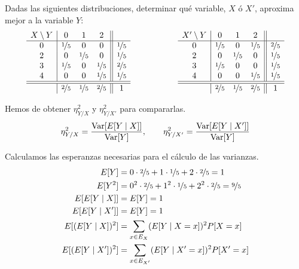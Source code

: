 \begin{ejercicio}
    Dadas las siguientes distribuciones, determinar qué variable, $X$ ó $X'$, aproxima mejor a la variable $Y$:
    \begin{equation*}
        \begin{array}{c|ccc||c}
            X\setminus Y & 0 & 1 & 2\\
            \hline
            0 & \nicefrac{1}{5} & 0 & 0 & \nicefrac{1}{5}\\
            2 & 0 & \nicefrac{1}{5} & 0 & \nicefrac{1}{5}\\
            3 & \nicefrac{1}{5} & 0 & \nicefrac{1}{5} & \nicefrac{2}{5}\\
            4 & 0 & 0 & \nicefrac{1}{5} & \nicefrac{1}{5}\\
            \hline \hline
            & \nicefrac{2}{5} & \nicefrac{1}{5} & \nicefrac{2}{5} & 1
        \end{array}
        \hspace{2cm}
        \begin{array}{c|ccc||c}
            X'\setminus Y & 0 & 1 & 2\\
            \hline
            0 & \nicefrac{1}{5} & 0 & \nicefrac{1}{5} & \nicefrac{2}{5}\\
            2 & 0 & \nicefrac{1}{5} & 0 & \nicefrac{1}{5}\\
            3 & \nicefrac{1}{5} & 0 & 0 & \nicefrac{1}{5}\\
            4 & 0 & 0 & \nicefrac{1}{5} & \nicefrac{1}{5}\\
            \hline \hline
            & \nicefrac{2}{5} & \nicefrac{1}{5} & \nicefrac{2}{5} & 1
        \end{array}
    \end{equation*}

    Hemos de obtener $\eta^2_{Y/X}$ y $\eta^2_{Y/X'}$ para compararlas.
    \begin{equation*}
        \eta^2_{Y/X} = \dfrac{\operatorname{Var}[E[Y\mid X]]}{\operatorname{Var}[Y]}, \qquad \eta^2_{Y/X'} = \dfrac{\operatorname{Var}[E[Y\mid X']]}{\operatorname{Var}[Y]}
    \end{equation*}

    Calculamos las esperanzas necesarias para el cálculo de las varianzas.
    \begin{align*}
        E[Y] &= 0\cdot \nicefrac{2}{5} + 1\cdot \nicefrac{1}{5} + 2\cdot \nicefrac{2}{5} = 1\\
        E[Y^2] &= 0^2\cdot \nicefrac{2}{5} + 1^2\cdot \nicefrac{1}{5} + 2^2\cdot \nicefrac{2}{5} = \nicefrac{9}{5}\\
        E[E[Y\mid X]] &= E[Y] = 1\\
        E[E[Y\mid X']] &= E[Y] = 1 \\
        E[(E[Y\mid X])^2] &= \sum_{x\in E_X} (E[Y\mid X = x])^2 P[X = x]\\
        E[(E[Y\mid X'])^2] &= \sum_{x\in E_{X'}} (E[Y\mid X' = x])^2 P[X' = x]
    \end{align*}


\end{ejercicio}

